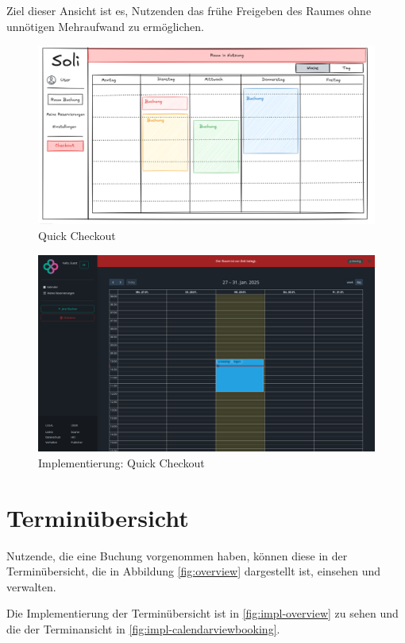 Ziel dieser Ansicht ist es, Nutzenden das frühe Freigeben des Raumes ohne unnötigen Mehraufwand zu ermöglichen.
\begin{figure}[ht]
    \centering
    \includegraphics[width=\textwidth]{figures/mockup/calendar_checkout}
    \caption{Quick Checkout}
    \label{fig:checkout}
\end{figure}
\clearpage

\begin{figure}[ht]
    \centering
    \includegraphics[width=\textwidth]{figures/impl-views/calendar_checkout}
    \caption{Implementierung: Quick Checkout}
    \label{fig:impl-checkout}
\end{figure}
\clearpage


\section{Terminübersicht}
Nutzende, die eine Buchung vorgenommen haben, können diese in der Terminübersicht,
die in Abbildung \ref{fig:overview} dargestellt ist, einsehen und verwalten.

Die Implementierung der Terminübersicht ist in \ref{fig:impl-overview} zu sehen und die der Terminansicht in \ref{fig:impl-calendarviewbooking}.

